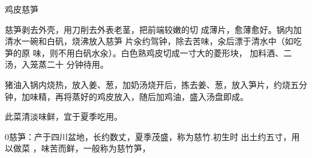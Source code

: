 \begin{recipe}{鸡皮慈笋}

\ingredients


\preparation

\step 慈笋剥去外壳，用刀削去外表老茎，把前端较嫩的切 成薄片，愈薄愈好。锅内加
清水一碗和白矾，烧沸放入慈笋 片汆约驾钟，除去苦味，汆后漂于清水中（如吃笋的原
味，则不用白矾水汆）。白色熟鸡皮切成一寸大的菱形块， 加料酒、二汤，入笼蒸二十
分钟待用。

\step 猪油入锅内烧热，放入姜、葱，加奶汤烧开后，拣去姜、葱，放入笋片，约烧五分
钟，加味精，再将蒸好的鸡皮放入，随后加鸡油，盛入汤盘即成。

\features

此菜清淡味鲜，宜于夏季吃用。

0慈笋：产于四川盆地，长约数丈，夏季茂盛，称为慈竹.初生时 出土约五寸，用以做菜
，味苦而鲜，一般称为慈竹笋，

\end{recipe}

